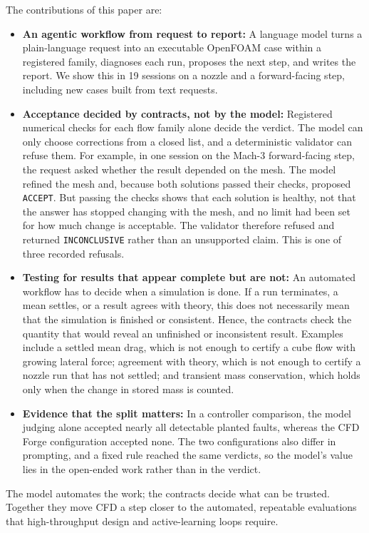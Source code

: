 \documentclass[11pt]{article}
\begin{document}
The contributions of this paper are:
\begin{itemize}
    \item \textbf{An agentic workflow from request to report:} A language model turns a plain-language request into an executable OpenFOAM case within a registered family, diagnoses each run, proposes the next step, and writes the report. We show this in 19 sessions on a nozzle and a forward-facing step, including new cases built from text requests.
    \item \textbf{Acceptance decided by contracts, not by the model:} Registered numerical checks for each flow family alone decide the verdict. The model can only choose corrections from a closed list, and a deterministic validator can refuse them. For example, in one session on the Mach-3 forward-facing step, the request asked whether the result depended on the mesh. The model refined the mesh and, because both solutions passed their checks, proposed \texttt{ACCEPT}. But passing the checks shows that each solution is healthy, not that the answer has stopped changing with the mesh, and no limit had been set for how much change is acceptable. The validator therefore refused and returned \texttt{INCONCLUSIVE} rather than an unsupported claim. This is one of three recorded refusals.
    \item \textbf{Testing for results that appear complete but are not:} An automated workflow has to decide when a simulation is done. If a run terminates, a mean settles, or a result agrees with theory, this does not necessarily mean that the simulation is finished or consistent. Hence, the contracts check the quantity that would reveal an unfinished or inconsistent result. Examples include a settled mean drag, which is not enough to certify a cube flow with growing lateral force; agreement with theory, which is not enough to certify a nozzle run that has not settled; and transient mass conservation, which holds only when the change in stored mass is counted.
    \item \textbf{Evidence that the split matters:} In a controller comparison, the model judging alone accepted nearly all detectable planted faults, whereas the CFD Forge configuration accepted none. The two configurations also differ in prompting, and a fixed rule reached the same verdicts, so the model's value lies in the open-ended work rather than in the verdict.
\end{itemize}
The model automates the work; the contracts decide what can be trusted. Together they move CFD a step closer to the automated, repeatable evaluations that high-throughput design and active-learning loops require.
\end{document}
